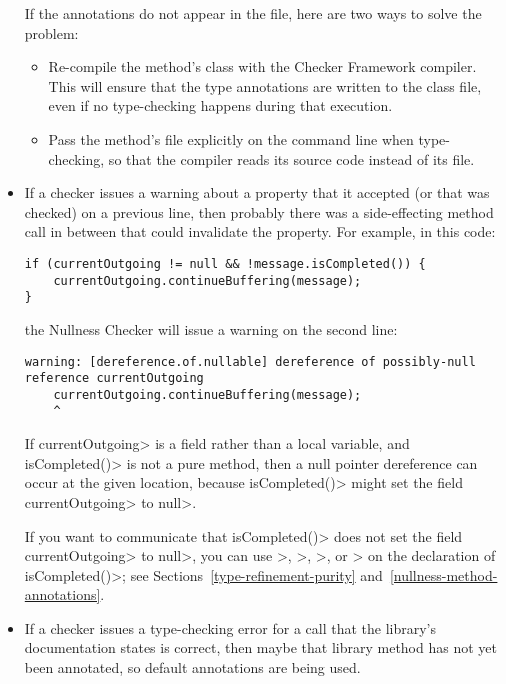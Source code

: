 \begin{itemize}
If the annotations do not appear in the  file, here are two
ways to solve the problem:
\begin{itemize}
\item
  Re-compile the method's class with the Checker Framework compiler.  This will
  ensure that the type annotations are written to the class file, even if
  no type-checking happens during that execution.
\item
  Pass the method's file explicitly on the command line when type-checking,
  so that the compiler reads its source code instead of its 
  file.
\end{itemize}

\item
If a checker issues a warning about a property that it accepted (or that
was checked) on a previous line, then probably there was a side-effecting
method call in between that could invalidate the property.  For example, in
this code:

\begin{Verbatim}
if (currentOutgoing != null && !message.isCompleted()) {
    currentOutgoing.continueBuffering(message);
}
\end{Verbatim}

\noindent
the Nullness Checker will issue a warning on the second line:
\begin{Verbatim}
warning: [dereference.of.nullable] dereference of possibly-null reference currentOutgoing
    currentOutgoing.continueBuffering(message);
    ^
\end{Verbatim}

If \<currentOutgoing> is a field rather than a local variable, and
\<isCompleted()> is not a pure method, then a null pointer
dereference can occur at the given location, because \<isCompleted()> might set
the field \<currentOutgoing> to \<null>.

If you want to communicate that
\<isCompleted()> does not set the field \<currentOutgoing> to \<null>, you can use
\<>,
\<>,
\<>,
or \<> on the
declaration of \<isCompleted()>; see Sections~\ref{type-refinement-purity}
and~\ref{nullness-method-annotations}.


\item
If a checker issues a type-checking error for a call that the library's
documentation states is correct, then maybe that library method has not yet
been annotated, so default annotations are being used.


\end{itemize}
